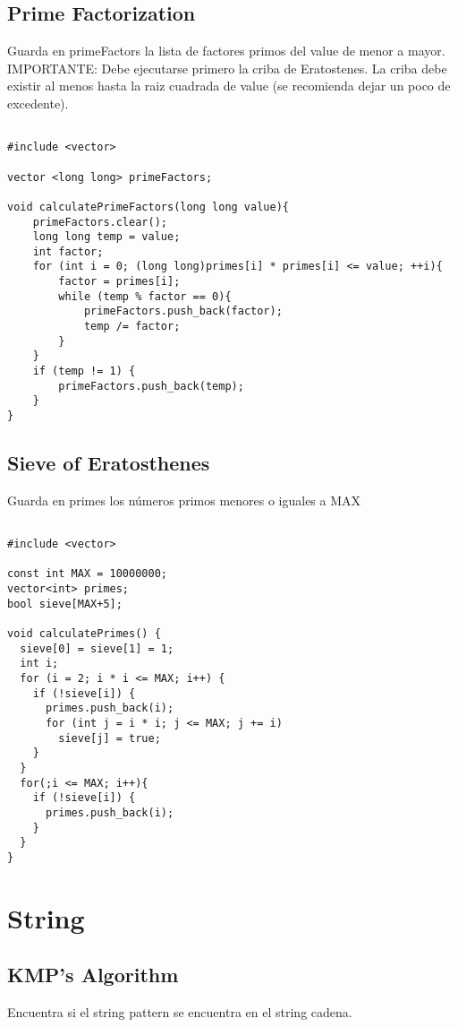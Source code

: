 \documentclass[11pt,letterpaper,twocolumn,twosided]{article}
\begin{document}
\subsection{Prime Factorization}
Guarda en primeFactors la lista de factores primos del value de menor a mayor. \\IMPORTANTE: Debe ejecutarse primero la criba de Eratostenes.  La criba debe existir al menos hasta la raiz cuadrada de value (se  recomienda dejar un poco de excedente).

\begin{lstlisting}

#include <vector>

vector <long long> primeFactors;

void calculatePrimeFactors(long long value){
	primeFactors.clear();
	long long temp = value;
	int factor;
	for (int i = 0; (long long)primes[i] * primes[i] <= value; ++i){
		factor = primes[i];
		while (temp % factor == 0){
			primeFactors.push_back(factor);
			temp /= factor;
		}
	}
	if (temp != 1) {
		primeFactors.push_back(temp);
	}
}
\end{lstlisting}

\subsection{Sieve of Eratosthenes}
Guarda en primes los n\'umeros primos menores o iguales a MAX

\begin{lstlisting}

#include <vector>

const int MAX = 10000000;
vector<int> primes;
bool sieve[MAX+5];

void calculatePrimes() {
  sieve[0] = sieve[1] = 1;
  int i;
  for (i = 2; i * i <= MAX; i++) {
    if (!sieve[i]) {
      primes.push_back(i);
      for (int j = i * i; j <= MAX; j += i)
        sieve[j] = true;
    }
  }
  for(;i <= MAX; i++){
  	if (!sieve[i]) {
      primes.push_back(i);
  	}
  }
}
\end{lstlisting}

\section{String}

\subsection{KMP's Algorithm}
Encuentra si el string pattern se encuentra en el string cadena.
\end{document}
